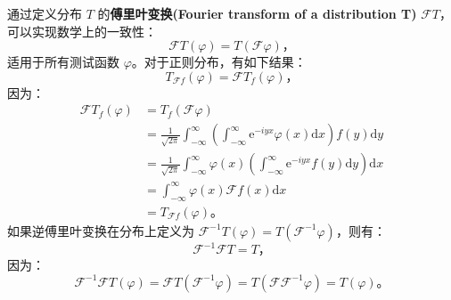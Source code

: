 通过定义分布 $T$ 的\textbf{傅里叶变换(Fourier transform of a distribution T)} $\mathcal{F} T$，可以实现数学上的一致性：
\begin{equation}\label{eq:12.14} 
 \mathcal{F} T(\varphi)=T(\mathcal{F} \varphi)， 
 \end{equation}
适用于所有测试函数 $\varphi$。对于正则分布，有如下结果：
 $$
T_{\mathcal{F} f}(\varphi) = \mathcal{F} T_f(\varphi)，
$$
因为：
 $$
\begin{aligned}
\mathcal{F} T_f(\varphi) & = T_f(\mathcal{F} \varphi) \\
& = \frac{1}{\sqrt{2 \pi}} \int_{-\infty}^\infty \left(\int_{-\infty}^\infty \mathrm{e}^{-i y x} \varphi(x) \mathrm{d}x \right) f(y) \mathrm{d}y \\
& = \frac{1}{\sqrt{2 \pi}} \int_{-\infty}^\infty \varphi(x) \left(\int_{-\infty}^\infty \mathrm{e}^{-i y x} f(y) \mathrm{d}y \right) \mathrm{d}x \\
& = \int_{-\infty}^\infty \varphi(x) \mathcal{F} f(x) \mathrm{d}x \\
& = T_{\mathcal{F} f}(\varphi)。
\end{aligned}
$$
如果逆傅里叶变换在分布上定义为
$\mathcal{F}^{-1} T(\varphi)=T\left(\mathcal{F}^{-1} \varphi\right)$，则有：
 $$
\mathcal{F}^{-1} \mathcal{F} T = T，
$$
因为：
 $$
\mathcal{F}^{-1} \mathcal{F} T(\varphi) = \mathcal{F} T\left(\mathcal{F}^{-1} \varphi\right) = T\left(\mathcal{F F}^{-1} \varphi\right) = T(\varphi)。
$$

